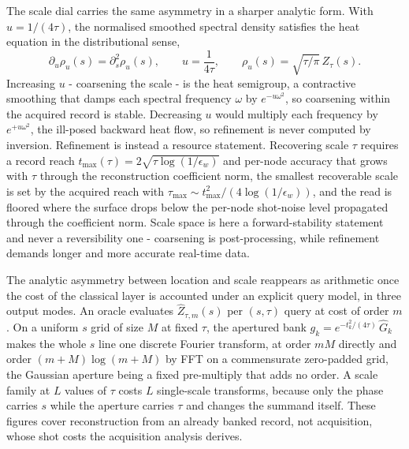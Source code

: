 The scale dial carries the same asymmetry in a sharper analytic form. With $u=1/(4\tau)$, the normalised smoothed spectral density satisfies the heat equation in the distributional sense,
\begin{equation}\label{irf:heat-kernel-scale-space}
\partial_u\rho_u(s)=\partial_s^{2}\rho_u(s),\qquad u=\frac{1}{4\tau},\qquad \rho_u(s)=\sqrt{\tau/\pi}\,Z_\tau(s).
\end{equation}
Increasing $u$ - coarsening the scale - is the heat semigroup, a contractive smoothing that damps each spectral frequency $\omega$ by $e^{-u\omega^{2}}$, so coarsening within the acquired record is stable. Decreasing $u$ would multiply each frequency by $e^{+u\omega^{2}}$, the ill-posed backward heat flow, so refinement is never computed by inversion. Refinement is instead a resource statement. Recovering scale $\tau$ requires a record reach $t_{\max}(\tau)=2\sqrt{\tau\log(1/\epsilon_w)}$ and per-node accuracy that grows with $\tau$ through the reconstruction coefficient norm, the smallest recoverable scale is set by the acquired reach with $\tau_{\max}\sim t_{\max}^{2}/(4\log(1/\epsilon_w))$, and the read is floored where the surface drops below the per-node shot-noise level propagated through the coefficient norm. Scale space is here a forward-stability statement and never a reversibility one - coarsening is post-processing, while refinement demands longer and more accurate real-time data.

The analytic asymmetry between location and scale reappears as arithmetic once the cost of the classical layer is accounted under an explicit query model, in three output modes. An oracle evaluates $\widehat Z_{\tau,m}(s)$ per $(s,\tau)$ query at cost of order $m$. On a uniform $s$ grid of size $M$ at fixed $\tau$, the apertured bank $g_k=e^{-t_k^{2}/(4\tau)}\,\widehat G_k$ makes the whole $s$ line one discrete Fourier transform, at order $mM$ directly and order $(m+M)\log(m+M)$ by FFT on a commensurate zero-padded grid, the Gaussian aperture being a fixed pre-multiply that adds no order. A scale family at $L$ values of $\tau$ costs $L$ single-scale transforms, because only the phase carries $s$ while the aperture carries $\tau$ and changes the summand itself. These figures cover reconstruction from an already banked record, not acquisition, whose shot costs the acquisition analysis derives.

